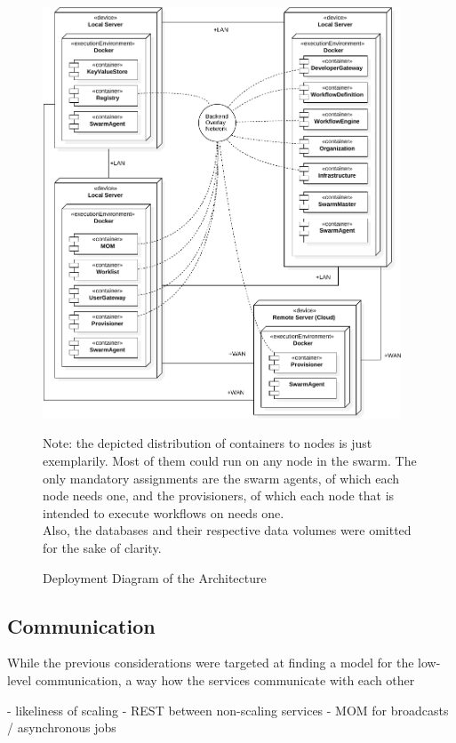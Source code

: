   \begin{figure}[htbp]
    \centering
    \includegraphics[width=0.95\textwidth]{content/images/Architecture-crop.pdf}
    \caption*{\scriptsize Note: the depicted distribution of containers to nodes is just exemplarily. Most of them could run on any node in the swarm. The only mandatory assignments are the swarm agents, of which each node needs one, and the provisioners, of which each node that is intended to execute workflows on needs one. \\ Also, the databases and their respective data volumes were omitted for the sake of clarity.}
    \caption{Deployment Diagram of the Architecture}
    \label{fig:label}
  \end{figure}

\subsection{Communication} %
  \label{sub:application_level_communication}
  While the previous considerations were targeted at finding a model for the low-level communication, a way how the services communicate with each other

  - likeliness of scaling
  - REST between non-scaling services
  - MOM for broadcasts / asynchronous jobs

